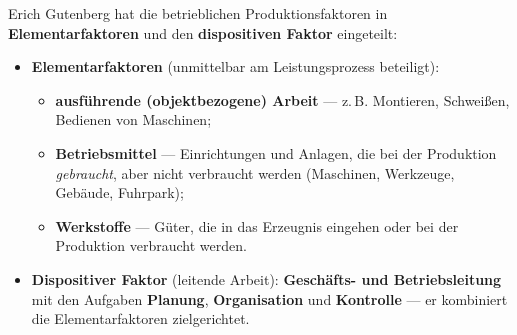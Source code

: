 \documentclass[11pt, a4paper]{article}
\begin{document}
Erich Gutenberg hat die betrieblichen Produktionsfaktoren in \textbf{Elementarfaktoren}
und den \textbf{dispositiven Faktor} eingeteilt:

\begin{itemize}
  \item \textbf{Elementarfaktoren} (unmittelbar am Leistungsprozess beteiligt):
    \begin{itemize}
      \item \textbf{ausführende (objektbezogene) Arbeit} --- z.\,B. Montieren, Schweißen,
        Bedienen von Maschinen;
      \item \textbf{Betriebsmittel} --- Einrichtungen und Anlagen, die bei der Produktion
        \emph{gebraucht}, aber nicht verbraucht werden (Maschinen, Werkzeuge, Gebäude,
        Fuhrpark);
      \item \textbf{Werkstoffe} --- Güter, die in das Erzeugnis eingehen oder bei der
        Produktion verbraucht werden.
    \end{itemize}
  \item \textbf{Dispositiver Faktor} (leitende Arbeit): \textbf{Geschäfts- und
    Betriebsleitung} mit den Aufgaben \textbf{Planung}, \textbf{Organisation} und
    \textbf{Kontrolle} --- er kombiniert die Elementarfaktoren zielgerichtet.
\end{itemize}
\end{document}
